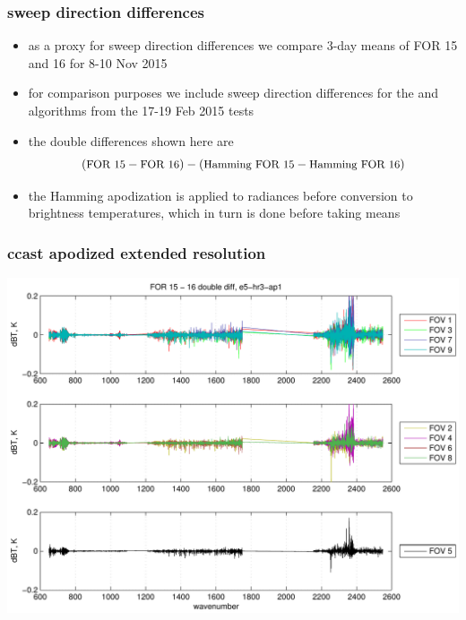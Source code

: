 \documentclass[11pt]{beamer}
\begin{document}
\begin{frame}
\frametitle{sweep direction differences}

\begin{itemize}

  \item as a proxy for sweep direction differences we compare 3-day
    means of FOR 15 and 16 for 8-10 Nov 2015

  \item for comparison purposes we include sweep direction
    differences for the {\ccast} and {\noaa} algorithms from the
    17-19 Feb 2015 tests

  \item the double differences shown here are \[(\mbox{\small FOR
    15} - \mbox{\small FOR 16}) - (\mbox{\small Hamming FOR 15} -
    \mbox{\small Hamming FOR 16})\]

  \item the Hamming apodization is applied to radiances before
    conversion to brightness temperatures, which in turn is done
    before taking means

\end{itemize}

\end{frame}
\begin{frame}
\frametitle{ccast apodized extended resolution}
\begin{center}
  \includegraphics[scale=0.5]{figures/rel_ddif_e5_hr3_ap1.pdf}
\end{center}
\end{frame}
\end{document}
